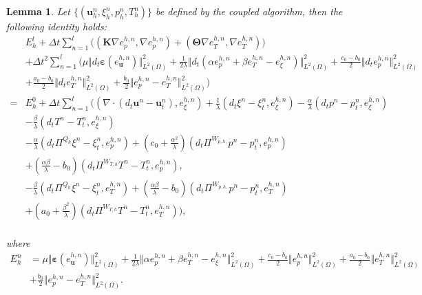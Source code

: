 \documentclass{article}
\newtheorem{lemma}{Lemma}[section]
\numberwithin{equation}{section}
\begin{document}
\begin{lemma}
 Let $\{(\bm u_h^n,\xi_h^n,p_h^n,T_h^n)\}$ be defined by the coupled algorithm, then the following
 identity holds:
 \begin{equation}\label{Ehl+Dt+Dt^2=Eh0+c}
\begin{aligned} 
& E_h^l + \Delta t \sum_{n=1}^l \big(  (\bm K\nabla e_p^{h,n},\nabla  e_p^{h,n})
                              +  (\bm\Theta\nabla e_T^{h,n},\nabla  e_T^{h,n})  \big) \\
 &+\Delta t^2\sum_{n=1}^l\Big(\mu\Vert d_t\bm\varepsilon(e_{\bm u}^{h,n})\Vert_{L^2(\Omega)}^2
+\frac1{2\lambda}\Vert d_t(\alpha  e_p^{h,n}+\beta  e_T^{h,n}- e_\xi^{h,n})\Vert_{L^2(\Omega)}^2
  +\frac{c_0-b_0}{2}\Vert d_t  e_p^{h,n}\Vert_{L^2(\Omega)}^2\\
  &+\frac{a_0-b_0}{2}\Vert d_t  e_T^{h,n}\Vert_{L^2(\Omega)}^2
  +\frac{b_0}{2}\Vert  e_p^{h,n}- e_T^{h,n}\Vert_{L^2(\Omega)}^2 \Big)  \\
 =& E_h^0 +\Delta t \sum_{n=1}^l\Big( (\nabla\cdot (d_t\bm u^n- \bm u_t^n ), e_{\xi}^{h,n})
    +\frac{1}{\lambda}(d_t\xi^n- \xi_t^n, e_{\xi}^{h,n})
   -\frac{\alpha}{\lambda}( d_tp^n- p_t^n, e_{\xi}^{h,n})\\
  & -\frac{\beta}{\lambda}(d_tT^n- T_t^n, e_{\xi}^{h,n})\\
  &-\frac\alpha\lambda(d_t\Pi^{Q_h} \xi^n- \xi_t^n , e_p^{h,n})
  +(c_0+\frac{\alpha^2}{\lambda})(d_t\Pi^{W_{p,h,}}p^n- p_t^n , e_p^{h,n}) \\
&+ (\frac{\alpha\beta}{\lambda}-b_0)(d_t\Pi^{W_{T,h}}T^n - T_t^n, e_p^{h,n}) ,\\
  &-\frac\beta\lambda(d_t\Pi^{Q_h} \xi^n- \xi_t^n, e_T^{h,n})
+(\frac{\alpha\beta}{\lambda}-b_0)(d_t\Pi^{W_{p,h,}}p^n- p_t^n, e_T^{h,n})\\
 &+(a_0+\frac{\beta^2}{\lambda})(d_t\Pi^{W_{T,h}}T^n - T_t^n, e_T^{h,n})\Big ),   
   \\                                  
\end{aligned}
\end{equation} 
 
where
\begin{equation}  
\begin{aligned} 
  E_h^n &= \mu\Vert\bm\varepsilon(e_{\bm u}^{h,n})\Vert_{L^2(\Omega)}^2  
  +\frac1{2\lambda} \Vert\alpha  e_p^{h,n}+\beta  e_T^{h,n}- e_\xi^{h,n}\Vert_{L^2(\Omega)}^2
  +\frac{c_0-b_0}{2} \Vert  e_p^{h,n}\Vert_{L^2(\Omega)}^2  
 +\frac{a_0-b_0}{2} \Vert  e_T^{h,n}\Vert_{L^2(\Omega)}^2 \\
&+\frac{b_0}{2} \Vert  e_p^{h,n}- e_T^{h,n}\Vert_{L^2(\Omega)}^2.
\end{aligned}
\end{equation} 
\end{lemma}
\end{document}
